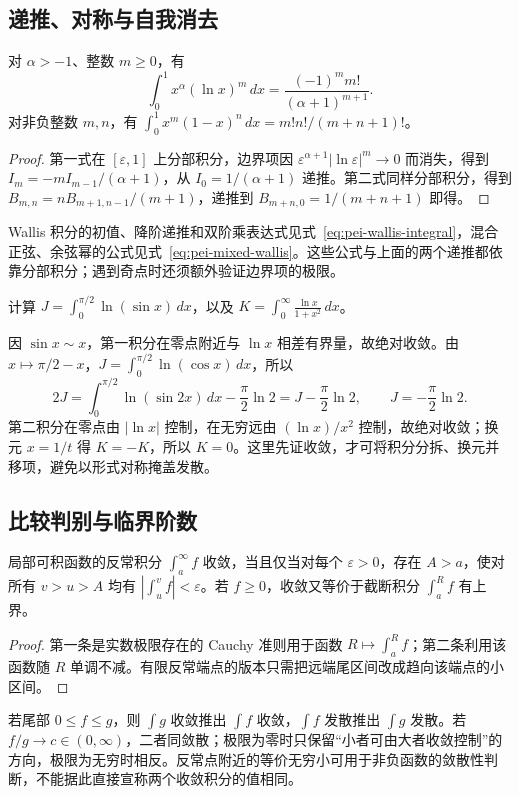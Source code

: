 \subsection{递推、对称与自我消去}
\begin{proposition}
对 $\alpha>-1$、整数 $m\ge0$，有
\[
 \int_0^1x^\alpha(\ln x)^m\,dx=\frac{(-1)^m m!}{(\alpha+1)^{m+1}}.
\]
对非负整数 $m,n$，有 $\int_0^1x^m(1-x)^n\,dx=m!n!/(m+n+1)!$。
\end{proposition}
\begin{proof}
第一式在 $[\varepsilon,1]$ 上分部积分，边界项因 $\varepsilon^{\alpha+1}|\ln\varepsilon|^m\to0$ 而消失，得到 $I_m=-mI_{m-1}/(\alpha+1)$，从 $I_0=1/(\alpha+1)$ 递推。第二式同样分部积分，得到 $B_{m,n}=nB_{m+1,n-1}/(m+1)$，递推到 $B_{m+n,0}=1/(m+n+1)$ 即得。
\end{proof}
Wallis 积分的初值、降阶递推和双阶乘表达式见式~\eqref{eq:pei-wallis-integral}，混合正弦、余弦幂的公式见式~\eqref{eq:pei-mixed-wallis}。这些公式与上面的两个递推都依靠分部积分；遇到奇点时还须额外验证边界项的极限。

\begin{example}
计算 $\displaystyle J=\int_0^{\pi/2}\ln(\sin x)\,dx$，以及 $\displaystyle K=\int_0^\infty\frac{\ln x}{1+x^2}\,dx$。
\end{example}
\begin{solve}
因 $\sin x\sim x$，第一积分在零点附近与 $\ln x$ 相差有界量，故绝对收敛。由 $x\mapsto\pi/2-x$，$J=\int_0^{\pi/2}\ln(\cos x)\,dx$，所以
\[
 2J=\int_0^{\pi/2}\ln(\sin2x)\,dx-\frac\pi2\ln2
 =J-\frac\pi2\ln2,
 \qquad J=-\frac\pi2\ln2.
\]
第二积分在零点由 $|\ln x|$ 控制，在无穷远由 $(\ln x)/x^2$ 控制，故绝对收敛；换元 $x=1/t$ 得 $K=-K$，所以 $K=0$。这里先证收敛，才可将积分分拆、换元并移项，避免以形式对称掩盖发散。
\end{solve}

\subsection{比较判别与临界阶数}
\begin{theorem}
\label{thm:pei-int-improper-cauchy}
局部可积函数的反常积分 $\int_a^\infty f$ 收敛，当且仅当对每个 $\varepsilon>0$，存在 $A>a$，使对所有 $v>u>A$ 均有 $|\int_u^vf|<\varepsilon$。若 $f\ge0$，收敛又等价于截断积分 $\int_a^Rf$ 有上界。
\end{theorem}
\begin{proof}
第一条是实数极限存在的 Cauchy 准则用于函数 $R\mapsto\int_a^Rf$；第二条利用该函数随 $R$ 单调不减。有限反常端点的版本只需把远端尾区间改成趋向该端点的小区间。
\end{proof}
若尾部 $0\le f\le g$，则 $\int g$ 收敛推出 $\int f$ 收敛，$\int f$ 发散推出 $\int g$ 发散。若 $f/g\to c\in(0,\infty)$，二者同敛散；极限为零时只保留“小者可由大者收敛控制”的方向，极限为无穷时相反。反常点附近的等价无穷小可用于非负函数的敛散性判断，不能据此直接宣称两个收敛积分的值相同。

